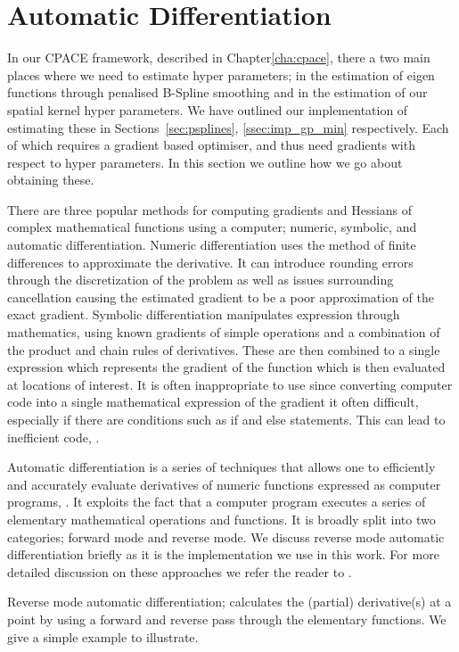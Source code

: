 \section{Automatic Differentiation \label{sec:auto_diff}}
In our CPACE framework, described in Chapter\ref{cha:cpace}, there a two main places where we need to estimate hyper parameters;
in the estimation of eigen functions through penalised B-Spline smoothing and in the estimation of our spatial kernel hyper parameters.
We have outlined our implementation of estimating these in Sections~\ref{sec:psplines}, \ref{ssec:imp_gp_min} respectively.
Each of which requires a gradient based optimiser, and thus need gradients with respect to hyper parameters.
In this section we outline how we go about obtaining these.

There are three popular methods for computing gradients and Hessians of complex mathematical functions using a computer; numeric, symbolic, and automatic differentiation.
Numeric differentiation uses the method of finite differences to approximate the derivative.
It can introduce rounding errors through the discretization of the problem as well as issues surrounding cancellation causing the estimated gradient to be a poor approximation of the exact gradient.
Symbolic differentiation manipulates expression through mathematics, using known gradients of simple operations and a combination of the product and chain rules of derivatives.
These are then combined to a single expression which represents the gradient of the function which is then evaluated at locations of interest.
It is often inappropriate to use since converting computer code into a single mathematical expression of the gradient it often difficult, especially if there are conditions such as if and else statements. 
This can lead to inefficient code, \citep{baydin_automatic_2018}.

Automatic differentiation is a series of techniques that allows one to efficiently and accurately evaluate derivatives of numeric functions expressed as computer programs, \citep{neidinger_introduction_2010}.
It exploits the fact that a computer program executes a series of elementary mathematical operations and functions.
It is broadly split into two categories; forward mode and reverse mode.
We discuss reverse mode automatic differentiation briefly as it is the implementation we use in this work.
For more detailed discussion on these approaches we refer the reader to \citep{neidinger_introduction_2010}.

Reverse mode automatic differentiation; calculates the (partial) derivative(s) at a point by using a forward and reverse pass through the elementary functions.
We give a simple example to illustrate.

